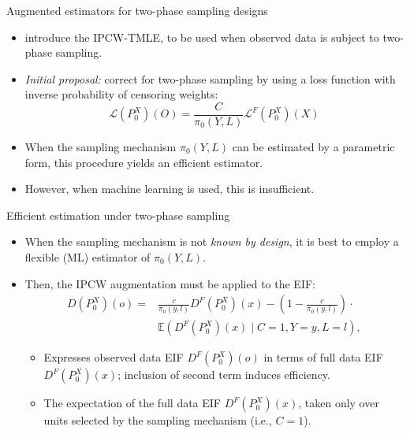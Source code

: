 \documentclass{beamer}
\newcommand{\E}{\mathbb{E}}
\newcommand{\lik}{\mathcal{L}}
\begin{document}
\begin{frame}[c]{Augmented estimators for two-phase sampling designs}

\begin{center}
\begin{itemize}
  \itemsep10pt
  \item \cite{rose2011targeted2sd} introduce the IPCW-TMLE, to be used when
    observed data is subject to two-phase sampling.
  \item \textit{Initial proposal:} correct for two-phase sampling by using a
    loss function with inverse probability of censoring weights:
    \begin{equation*}
      \lik(P_0^X)(O) = \frac{C}{\pi_0(Y, L)}\lik^F(P_0^X)(X)
    \end{equation*}
  \item When the sampling mechanism $\pi_0(Y,L)$ can be estimated by
    a parametric form, this procedure yields an efficient estimator.
  \item However, when machine learning is used, this is insufficient.
\end{itemize}
\end{center}

\note{
}

\end{frame}


\begin{frame}[c]{Efficient estimation under two-phase sampling}

\begin{center}
\begin{itemize}
  \itemsep10pt
  \item When the sampling mechanism is not \textit{known by design}, it is best
    to employ a flexible (ML) estimator of $\pi_0(Y, L)$.
  \item Then, the IPCW augmentation must be applied to the EIF:
    \begin{align*}
      D(P_0^X)(o) = &\frac{c}{\pi_0(y, l)} D^F(P_0^X)(x) - \left(1 -
        \frac{c}{\pi_0(y, l)}\right) \cdot \\ &\E(D^F(P_0^X)(x) \mid
        C = 1, Y = y, L = l),
    \end{align*}
   \begin{itemize}
    \itemsep6pt
     \item Expresses observed data EIF $D^F(P_0^X)(o)$ in terms of full data
       EIF $D^F(P_0^X)(x)$; inclusion of second term induces efficiency.
     \item The expectation of the full data EIF $D^F(P_0^X)(x)$, taken only over
      units selected by the sampling mechanism (i.e., $C = 1$).
  \end{itemize}
\end{itemize}
\end{center}

\note{
}

\end{frame}
\end{document}
